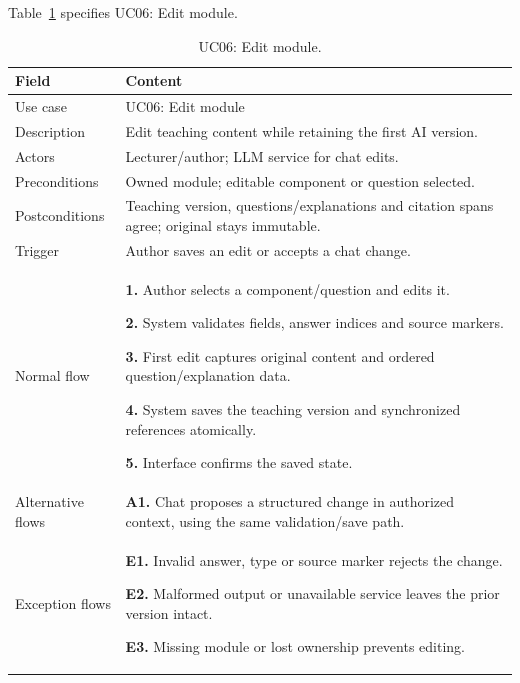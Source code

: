 \needspace{.39\textheight}
Table~\ref{tab:uc-06} specifies UC06: Edit module.
\begin{table}[H]\centering\footnotesize{}\renewcommand{\arraystretch}{1.05}
\caption{UC06: Edit module.}\label{tab:uc-06}
\begin{tabular}{|p{2.8cm}|p{11.9cm}|}\hline
\textbf{Field} & \textbf{Content}\\\hline
Use case & UC06: Edit module\\\hline
Description & Edit teaching content while retaining the first AI version.\\\hline
Actors & Lecturer/author; LLM service for chat edits.\\\hline
Preconditions & Owned module; editable component or question selected.\\\hline
Postconditions & Teaching version, questions/explanations and citation spans agree; original stays immutable.\\\hline
Trigger & Author saves an edit or accepts a chat change.\\\hline
Normal flow & \textbf{1.} Author selects a component/question and edits it.\par \textbf{2.} System validates fields, answer indices and source markers.\par \textbf{3.} First edit captures original content and ordered question/explanation data.\par \textbf{4.} System saves the teaching version and synchronized references atomically.\par \textbf{5.} Interface confirms the saved state.\\\hline
Alternative flows & \textbf{A1.} Chat proposes a structured change in authorized context, using the same validation/save path.\\\hline
Exception flows & \textbf{E1.} Invalid answer, type or source marker rejects the change.\par \textbf{E2.} Malformed output or unavailable service leaves the prior version intact.\par \textbf{E3.} Missing module or lost ownership prevents editing.\\\hline
\end{tabular}\end{table}

